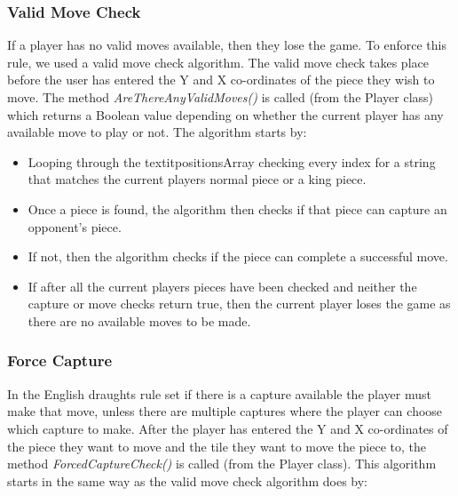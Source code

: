\documentclass[10pt, a4paper]{article}
\begin{document}
    	\subsubsection{Valid Move Check}
    	If a player has no valid moves available, then they lose the game. To enforce this rule, we used a valid move check algorithm. The valid move check takes place before the user has entered the Y and X co-ordinates of the piece they wish to move. The method \textit{AreThereAnyValidMoves()} is called (from the Player class) which returns a Boolean value depending on whether the current player has any available move to play or not.
    	\newline
    	The algorithm starts by:  
    	
   
   		\begin{itemize}
	   		\item Looping through the textit{positionsArray} checking every index for a string that matches the current players normal piece or a king piece.  
	   		\item Once a piece is found, the algorithm then checks if that piece can capture an opponent's piece.
	   		\item If not, then the algorithm checks if the piece can complete a successful move. 
			\item If after all the current players pieces have been checked and neither the capture or move checks return true, then the current player loses the game as there are no available moves to be made. 
   		\end{itemize}
   
   
    
    
    	\subsubsection{Force Capture} 
    	In the English draughts rule set if there is a capture available the player must make that move, unless there are multiple captures where the player can choose which capture to make. After the player has entered the Y and X co-ordinates of the piece they want to move and the tile they want to move the piece to, the method \textit{ForcedCaptureCheck()} is called (from the Player class).
    	\newline
    	This algorithm starts in the same way as the valid move check algorithm does by:    
    
\end{document}
